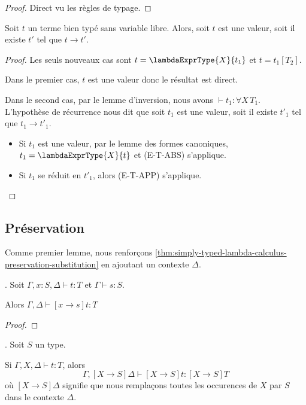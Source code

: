 \begin{proof}
  Direct vu les règles de typage.
\end{proof}

\begin{theorem} [de progression]
  Soit $t$ un terme bien typé sans variable libre. Alors, soit $t$ est une
  valeur, soit il existe $t'$ tel que $t \rightarrow t'$.
\end{theorem}

\begin{proof}
  Les seuls nouveaux cas sont $t = \lambdaExprType{X}{t_{1}}$ et $t =
  t_{1}[T_{2}]$.

  Dans le premier cas, $t$ est une valeur donc le résultat est direct.

  Dans le second cas, par le lemme d'inversion, nous avons $\vdash t_{1} :
  \forall X \, T_{1}$. L'hypothèse de récurrence nous dit que soit $t_{1}$ est
  une valeur, soit il existe $t'_{1}$ tel que $t_{1} \rightarrow t'_{1}$.

  \begin{itemize}
  \item Si $t_{1}$ est une valeur, par le lemme des formes canoniques, $t_{1} =
    \lambdaExprType{X}{t}$ et (E-T-ABS) s'applique.
  \item Si $t_{1}$ se réduit en $t'_{1}$, alors (E-T-APP) s'applique.
  \end{itemize}
\end{proof}

\subsection*{Préservation}

Comme premier lemme, nous renforçons
\ref{thm:simply-typed-lambda-calculus-preservation-substitution} en ajoutant un
contexte $\Delta$.

\begin{lemma}
  \label{thm:system-f-preservation-substitution-term}.
  Soit $\Gamma, x : S, \Delta \vdash t : T$ et $\Gamma \vdash s : S$.

  Alors $\Gamma, \Delta \vdash [x \rightarrow s] t : T$
\end{lemma}

\begin{proof}
  
\end{proof}

\begin{lemma} 
  \label{thm:system-f-preservation-substitution-type}.
  Soit $S$ un type.

  Si $\Gamma, X, \Delta \vdash t : T$, alors
  \begin{equation}
    \Gamma, [X \rightarrow S]\Delta \vdash [X \rightarrow S]t : [X \rightarrow S] T 
  \end{equation}
  où $[X \rightarrow S]\Delta$ signifie que nous remplaçons toutes les
  occurences de $X$ par $S$ dans le contexte $\Delta$.
\end{lemma}

